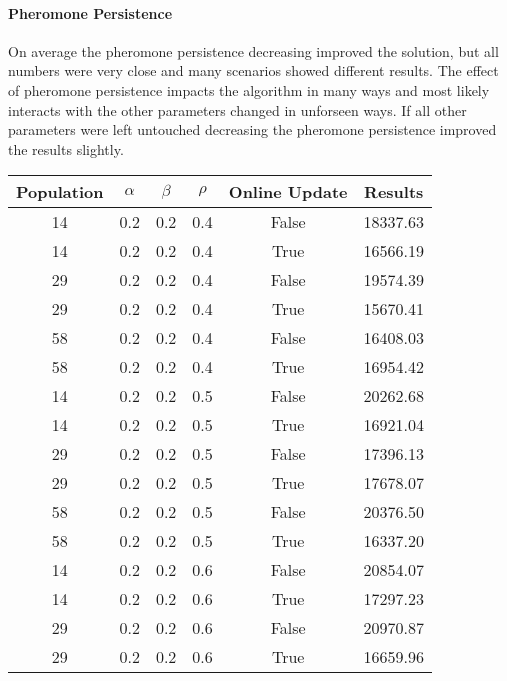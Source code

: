 \documentclass[12pt]{article}
\begin{document}
\paragraph{Pheromone Persistence} %
On average the pheromone persistence decreasing improved the solution, but all numbers were very close and many scenarios showed different results. The effect of pheromone persistence impacts the algorithm in many ways and most likely interacts with the other parameters changed in unforseen ways. If all other parameters were left untouched decreasing the pheromone persistence improved the results slightly.  







\begin{table}[h!]
\centering
\begin{tabular}{|c|c|c|c|c|c|}
\hline
\textbf{Population} & $\alpha$ & $\beta$ & $\rho$ & \textbf{Online Update} & \textbf{Results} \\ \hline
14  &  0.2  &  0.2  &  0.4  &  False  &  18337.63\\ \hline
14  &  0.2  &  0.2  &  0.4  &  True  &  16566.19\\ \hline
29  &  0.2  &  0.2  &  0.4  &  False  &  19574.39\\ \hline
29  &  0.2  &  0.2  &  0.4  &  True  &  15670.41\\ \hline
58  &  0.2  &  0.2  &  0.4  &  False  &  16408.03\\ \hline
58  &  0.2  &  0.2  &  0.4  &  True  &  16954.42\\ \hline
14  &  0.2  &  0.2  &  0.5  &  False  &  20262.68\\ \hline
14  &  0.2  &  0.2  &  0.5  &  True  &  16921.04\\ \hline
29  &  0.2  &  0.2  &  0.5  &  False  &  17396.13\\ \hline
29  &  0.2  &  0.2  &  0.5  &  True  &  17678.07\\ \hline
58  &  0.2  &  0.2  &  0.5  &  False  &  20376.50\\ \hline
58  &  0.2  &  0.2  &  0.5  &  True  &  16337.20\\ \hline
14  &  0.2  &  0.2  &  0.6  &  False  &  20854.07\\ \hline
14  &  0.2  &  0.2  &  0.6  &  True  &  17297.23\\ \hline
29  &  0.2  &  0.2  &  0.6  &  False  &  20970.87\\ \hline
29  &  0.2  &  0.2  &  0.6  &  True  &  16659.96\\ \hline

\end{tabular}
\end{table}
\end{document}
